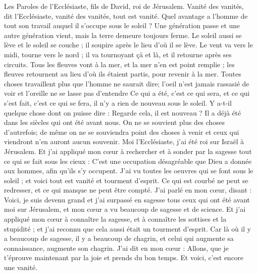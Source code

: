 \begin{multicols}{2}
\VerseOne{}Les Paroles de l'Ecclésiaste, fils de David, roi de Jérusalem.
Vanité des vanités, dit l'Ecclésiaste, vanité des vanités, tout est vanité.
Quel avantage a l'homme de tout son travail auquel il s'occupe sous le soleil ?
Une génération passe et une autre génération vient, mais la terre demeure toujours ferme.
Le soleil aussi se lève et le soleil se couche ; il soupire après le lieu d'où il se lève.
Le vent va vers le midi, tourne vers le nord ; il va tournoyant çà et là, et il retourne après ses circuits.
Tous les fleuves vont à la mer, et la mer n'en est point remplie ; les fleuves retournent au lieu d'où ils étaient partis, pour revenir à la mer. 
Toutes choses travaillent plus que l'homme ne saurait dire; l'oeil n'est jamais rassasié de voir et l'oreille ne se lasse pas d'entendre 
Ce qui a été, c'est ce qui sera, et ce qui s'est fait, c'est ce qui se fera, il n'y a rien de nouveau sous le soleil.
Y a-t-il quelque chose dont on puisse dire : Regarde cela, il est nouveau ? Il a déjà été dans les siècles qui ont été avant nous.
On ne se souvient plus des choses d'autrefois; de même on ne se souviendra point des choses à venir et ceux qui viendront n'en auront aucun souvenir. 
Moi l'Ecclésiaste, j'ai été roi sur Israël à Jérusalem.
Et j'ai appliqué mon cœur à rechercher et à sonder par la sagesse tout ce qui se fait sous les cieux : C'est une occupation désagréable que Dieu a donnée aux hommes, afin qu'ils s'y occupent.
J'ai vu toutes les oeuvres qui se font sous le soleil ; et voici tout est vanité et tourment d'esprit.
Ce qui est courbé ne peut se redresser, et ce qui manque ne peut être compté.
J'ai parlé en mon cœur, disant : Voici, je suis devenu grand et j'ai surpassé en sagesse tous ceux qui ont été avant moi sur Jérusalem, et mon cœur a vu beaucoup de sagesse et de science.
Et j'ai appliqué mon cœur à connaître la sagesse, et à connaître les sottises et la stupidité ; et j'ai reconnu que cela aussi était un tourment d'esprit.
Car là où il y a beaucoup de sagesse, il y a beaucoup de chagrin, et celui qui augmente sa connaissance, augmente son chagrin.
\VerseOne{}J'ai dit en mon cœur : Allons, que je t'éprouve maintenant par la joie et prends du bon temps. Et voici, c'est encore une vanité.

\end{multicols}
